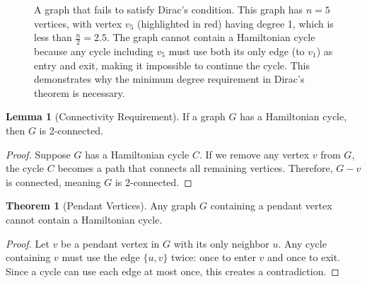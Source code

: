 \documentclass{article}
\theoremstyle{definition}
\newtheorem{theorem}{Theorem}
\newtheorem{lemma}{Lemma}
\begin{document}
\begin{figure}[h!]
\begin{center}
\end{center}
\caption{A graph that fails to satisfy Dirac's condition. This graph has $n = 5$ vertices, with vertex $v_5$ (highlighted in red) having degree 1, which is less than $\frac{n}{2} = 2.5$. The graph cannot contain a Hamiltonian cycle because any cycle including $v_5$ must use both its only edge (to $v_1$) as entry and exit, making it impossible to continue the cycle. This demonstrates why the minimum degree requirement in Dirac's theorem is necessary.}
\label{fig:dirac-fails}
\end{figure}

\begin{lemma}[Connectivity Requirement]
If a graph $G$ has a Hamiltonian cycle, then $G$ is 2-connected.
\end{lemma}

\begin{proof}
Suppose $G$ has a Hamiltonian cycle $C$. If we remove any vertex $v$ from $G$, the cycle $C$ becomes a path that connects all remaining vertices. Therefore, $G-v$ is connected, meaning $G$ is 2-connected.
\end{proof}

\begin{theorem}[Pendant Vertices]
Any graph $G$ containing a pendant vertex cannot contain a Hamiltonian cycle.
\end{theorem}

\begin{proof}
Let $v$ be a pendant vertex in $G$ with its only neighbor $u$. Any cycle containing $v$ must use the edge $\{u,v\}$ twice: once to enter $v$ and once to exit. Since a cycle can use each edge at most once, this creates a contradiction.
\end{proof}
\end{document}
